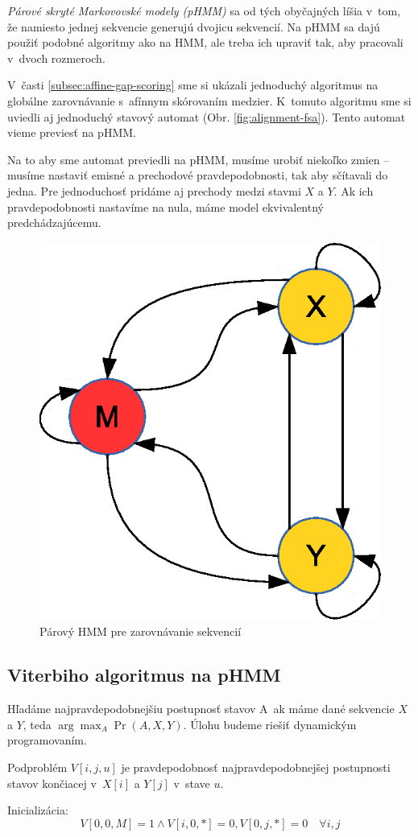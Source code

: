 \textit{Párové skryté Markovovské modely (pHMM)} sa od tých obyčajných líšia v~tom, že namiesto jednej sekvencie generujú dvojicu sekvencií. Na pHMM sa dajú použiť podobné algoritmy ako na HMM, ale treba ich upraviť tak, aby pracovali v~dvoch rozmeroch.

V~časti \ref{subsec:affine-gap-scoring} sme si ukázali jednoduchý algoritmus na globálne zarovnávanie s~afínnym skórovaním medzier. K~tomuto algoritmu sme si uviedli aj jednoduchý stavový automat (Obr. \ref{fig:alignment-fsa}). Tento automat vieme previesť na pHMM.

Na to aby sme automat previedli na pHMM, musíme urobiť niekoľko zmien -- musíme nastaviť emisné a prechodové pravdepodobnosti, tak aby sčítavali do jedna. Pre jednoduchosť pridáme aj prechody medzi stavmi $X$ a $Y$. Ak ich pravdepodobnosti nastavíme na nula, máme model ekvivalentný predchádzajúcemu. \cite{durbin}

\begin{figure}[htp]
    \centering
    \includegraphics[width=.4\textwidth]{images/simple_model}
    \caption{Párový HMM pre zarovnávanie sekvencií}
    \label{fig:simple-model}
\end{figure}

\subsection{Viterbiho algoritmus na pHMM}
Hľadáme najpravdepodobnejšiu postupnosť stavov A~ak máme dané sekvencie $X$ a $Y$, teda $\arg\max_A \Pr(A, X, Y)$. Úlohu budeme riešiť dynamickým programovaním.

Podproblém $V[i, j, u]$ je pravdepodobnosť najpravdepodobnejšej postupnosti stavov končiacej v~$X[i]$ a $Y[j]$ v~stave $u$.

Inicializácia:
\begin{equation}
\label{eq:viterbi-init}
V[0,0,M] = 1 \wedge V[i,0,*] = 0, V[0,j,*] = 0\quad \forall i, j
\end{equation}

